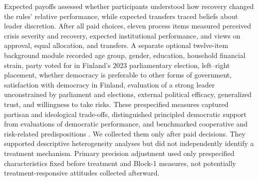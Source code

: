 \documentclass[11pt]{article}
\begin{document}
Expected payoffs assessed whether participants understood how recovery changed the rules' relative performance, while expected transfers traced beliefs about leader discretion. After all paid choices, eleven process items measured perceived crisis severity and recovery, expected institutional performance, and views on approval, equal allocation, and transfers. A separate optional twelve-item background module recorded age group, gender, education, household financial strain, party voted for in Finland's 2023 parliamentary election, left--right placement, whether democracy is preferable to other forms of government, satisfaction with democracy in Finland, evaluation of a strong leader unconstrained by parliament and elections, external political efficacy, generalized trust, and willingness to take risks. These prespecified measures captured partisan and ideological trade-offs, distinguished principled democratic support from evaluations of democratic performance, and benchmarked cooperative and risk-related predispositions \parencites{GRAHAM2020,0b3bf,Claassen2020,Dohmen2011,Glaeser2000}. We collected them only after paid decisions. They supported descriptive heterogeneity analyses but did not independently identify a treatment mechanism. Primary precision adjustment used only prespecified characteristics fixed before treatment and Block-1 measures, not potentially treatment-responsive attitudes collected afterward.
\end{document}
